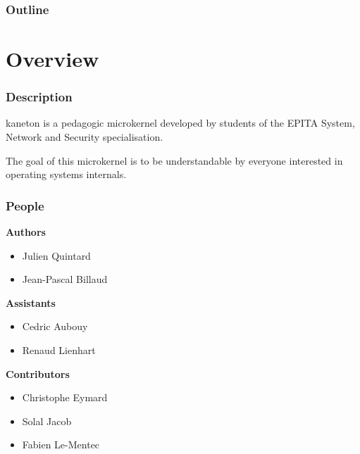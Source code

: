 %
%



%
%

\begin{frame}
  \titlepage

  \begin{center}
    \logos
  \end{center}
\end{frame}

%
%

\begin{frame}
  \frametitle{Outline}
  \tableofcontents
\end{frame}

%
%

\section{Overview}


\begin{frame}
  \frametitle{Description}

  kaneton is a pedagogic microkernel developed by students of the
  EPITA System, Network and Security specialisation.

  \nl

  The goal of this microkernel is to be understandable by everyone
  interested in operating systems internals.
\end{frame}


\begin{frame}
  \frametitle{People}

  \textbf{Authors}

  \begin{itemize}
    \item
      Julien Quintard
    \item
      Jean-Pascal Billaud
  \end{itemize}

  \nl

  \textbf{Assistants}

  \begin{itemize}
    \item
      Cedric Aubouy
    \item
      Renaud Lienhart
  \end{itemize}

  \nl

  \textbf{Contributors}

  \begin{itemize}
    \item
      Christophe Eymard
    \item
      Solal Jacob
    \item
      Fabien Le-Mentec
  \end{itemize}
\end{frame}

